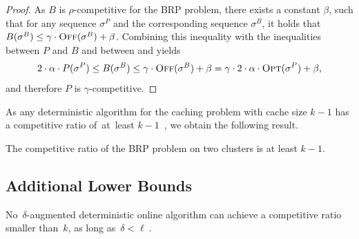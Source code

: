 \begin{proof}
As $B$ is $\rho$-competitive for the BRP problem, there exists a constant
$\beta$, such that for any sequence $\sigma^P$ and the corresponding sequence
$\sigma^B$, it holds that $B(\sigma^B) \leq \gamma \cdot \textsc{Off}(\sigma^B) +
\beta$. Combining this inequality with the inequalities between $P$ and $B$
and between \OFF and \OPT yields
\[
	2 \cdot \alpha \cdot P(\sigma^P) \leq 
	B(\sigma^B) \leq \gamma \cdot \textsc{Off}(\sigma^B) + \beta
	 =\gamma \cdot 2 \cdot \alpha \cdot \textsc{Opt}(\sigma^P) + \beta,
\]
and therefore $P$ is $\gamma$-competitive.
\end{proof}

As any deterministic algorithm for the caching problem with cache size $k-1$
has a competitive ratio of~at~least $k-1$~\cite{SleTar85}, we obtain the
following result.

\begin{corollary}
The competitive ratio of the BRP problem on two clusters is at least $k-1$. 
\end{corollary}


\subsection{Additional Lower Bounds}
\label{sec:lower-bounds}

\begin{theorem}\label{thm:loweraugmk}
No~$\delta$-augmented deterministic online algorithm \ONL
can achieve a competitive ratio smaller than~$k$, as long as~$\delta < \ell~$.
\end{theorem}

